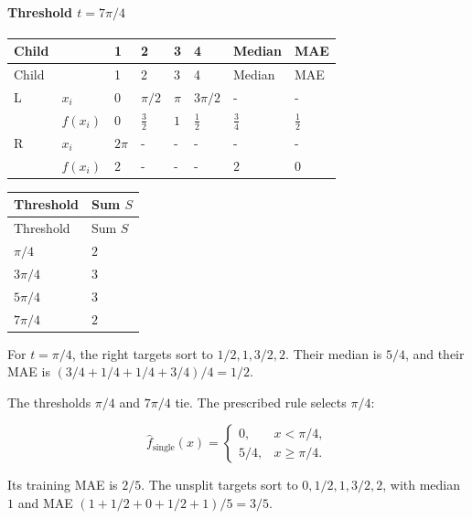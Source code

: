 \documentclass[10pt]{article}
\begin{document}
\paragraph*{Threshold $t=7\pi/4$}
\begingroup
\small
\setlength{\tabcolsep}{4pt}
\begin{longtable}{l|l|l|l|l|l|l|l}
Child &  & 1 & 2 & 3 & 4 & Median & MAE \\
\hline
\endfirsthead
Child &  & 1 & 2 & 3 & 4 & Median & MAE \\
\hline
\endhead
L & $x_i$ & $0$ & $\pi/2$ & $\pi$ & $3\pi/2$ & - & - \\[3pt]
 & $f(x_i)$ & $0$ & $\frac{3}{2}$ & $1$ & $\frac{1}{2}$ & $\frac{3}{4}$ & $\frac{1}{2}$ \\[3pt]
R & $x_i$ & $2\pi$ & - & - & - & - & - \\[3pt]
 & $f(x_i)$ & $2$ & - & - & - & $2$ & $0$ \\[3pt]
\end{longtable}
\endgroup
\begingroup
\small
\setlength{\tabcolsep}{4pt}
\begin{longtable}{l|l}
Threshold & Sum $S$ \\
\hline
\endfirsthead
Threshold & Sum $S$ \\
\hline
\endhead
$\pi/4$ & $2$ \\[1.5pt]
$3\pi/4$ & $3$ \\[1.5pt]
$5\pi/4$ & $3$ \\[1.5pt]
$7\pi/4$ & $2$ \\[1.5pt]
\end{longtable}
\endgroup
For $t=\pi/4$, the right targets sort to $1/2,1,3/2,2$. Their median is
$5/4$, and their MAE is $(3/4+1/4+1/4+3/4)/4=1/2$.

The thresholds $\pi/4$ and $7\pi/4$ tie. The prescribed rule selects
$\pi/4$:

\begin{center}\end{center}

\[
\hat f_{\mathrm{single}}(x)=\begin{cases}0,&x<\pi/4,\\5/4,&x\geq\pi/4.\end{cases}
\]

Its training MAE is $2/5$. The unsplit targets sort to $0,1/2,1,3/2,2$,
with median $1$ and MAE $(1+1/2+0+1/2+1)/5=3/5$.
\end{document}
